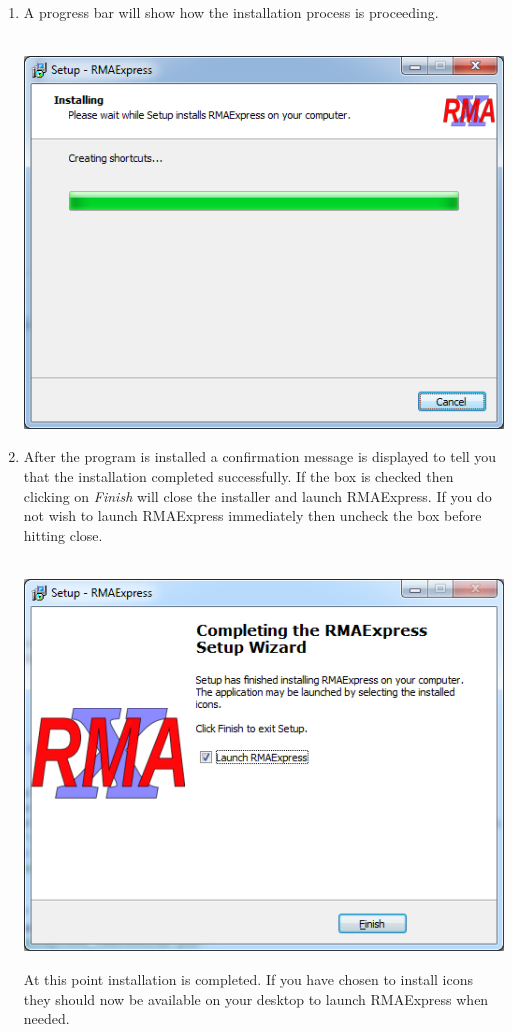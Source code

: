 \documentclass[11pt]{report}
\begin{document}
\begin{enumerate}
\item A progress bar will show how the installation process is proceeding.\\ \\
\begin{center}
\includegraphics[scale=0.5]{Setup6}
\end{center}
\item After the program is installed a confirmation message is displayed to tell you that the installation completed successfully. If the box is checked then clicking on {\it Finish} will close the installer and launch RMAExpress. If you do not wish to launch RMAExpress immediately then uncheck the box before hitting close. \\ \\
\begin{center}
\includegraphics[scale=0.5]{Setup7} 
\end{center}
At this point installation is completed. If you have chosen to install icons they should now be available on your desktop to launch RMAExpress when needed.


\end{enumerate}
\end{document}
